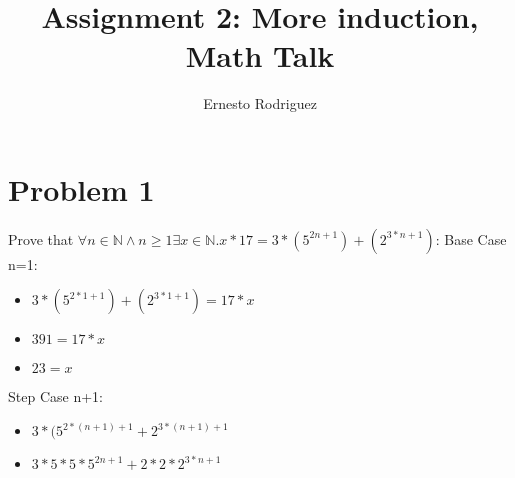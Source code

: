 \documentclass{article}
\title{Assignment 2: More induction, Math Talk}
\author{Ernesto Rodriguez}
\begin{document}
\maketitle

\section{Problem 1}

Prove that $\forall n \in \mathbb{N} \wedge n \geq 1 \exists x \in \mathbb{N} . x*17 = 3*(5^{2n+1})+(2^{3*n+1}) $: 
\newline
Base Case n=1:

\begin{itemize}
  
\item {$3*(5^{2*1+1})+(2^{3*1+1})=17*x$}
\item $391=17*x$
\item $23=x$

\end{itemize}

Step Case n+1:

\begin{itemize}

  \item{$3*(5^{2*(n+1)+1} + 2^{3*(n+1)+1}$}
  \item{$3*5*5*5^{2n+1} + 2*2*2^{3*n+1}$}

\end{itemize}
\end{document}
